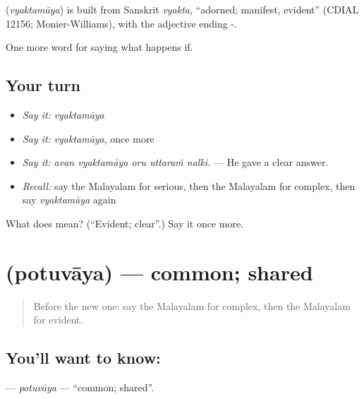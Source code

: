 \begin{cousinweb}
\textbf{} (\emph{vyaktamāya}) is built from Sanskrit \emph{vyakta}, \textquotedblleft{}adorned; manifest, evident\textquotedblright{} (CDIAL 12156; Monier-Williams), with the adjective ending -.
\end{cousinweb}

\begin{grammarlens}[title={What you've built}]
One more word for saying what happens if.
\end{grammarlens}

\subsection*{Your turn}
\begin{itemize}
\raggedright
  \item \emph{Say it:} \emph{vyaktamāya}
  \item \emph{Say it:} \emph{vyaktamāya}, once more
  \item \emph{Say it:} \emph{avan vyaktamāya oru uttaraṁ nalki.} — He gave a clear answer.
  \item \emph{Recall:} say the Malayalam for serious, then the Malayalam for complex, then say \emph{vyaktamāya} again
\end{itemize}

\begin{tcolorbox}[breakable,colback=teal!4,colframe=teal!35!black,title={Before you move on}]
What does  mean? (\textquotedblleft{}Evident; clear\textquotedblright{}.) Say it once more.
\end{tcolorbox}
\section[\texorpdfstring{\ml{പൊതുവായ} (potuvāya)}{പൊതുവായ (potuvāya)}]{ (potuvāya) — common; shared}

\label{lesson:ML-C446-potuvaya}



\begin{quote}
Before the new one: say the Malayalam for complex, then the Malayalam for evident.
\end{quote}

\subsection*{You'll want to know: }
\textbf{} — \emph{potuvāya} — \textquotedblleft{}common; shared\textquotedblright{}.

